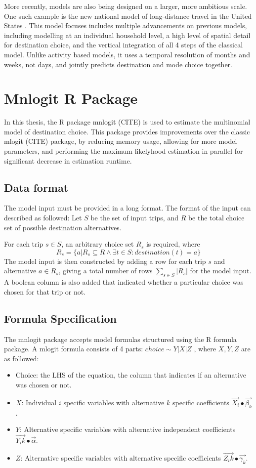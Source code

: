 More recently, models are also being designed on a larger, more ambitious scale. One such example is the new national model of long-distance travel in the United States \parencite{Outwater15}. This model focuses includes multiple advancements on previous models, including modelling at an individual household level, a high level of spatial detail for destination choice, and the vertical integration of all 4 steps of the classical model. Unlike activity based models, it uses a temporal resolution of months and weeks, not days, and jointly predicts destination and mode choice together. 

\section{Mnlogit R Package}
In this thesis, the R package mnlogit (CITE) is used to estimate the multinomial model of destination choice. This package provides improvements over the classic mlogit (CITE) package, by reducing memory usage, allowing for more model parameters, and performing the maximum likelyhood estimation in parallel for significant decrease in estimation runtime.
\subsection{Data format}
The model input must be provided in a long format. The format of the input can described as followed:
Let \(S\)  be the set of input trips, and \(R\)  be the total choice set of possible destination alternatives. 


For each trip $s \in S$, an arbitrary choice set $R_s$ is required, where
$$ R_s  =  \{a | R_s \subseteq R \wedge \exists t \in S : destination(t) = a \} $$ 
The model input is then constructed by adding a row for each trip $s$ and alternative $a \in R_s$, giving a total number of rows  $ \sum_{s \in S} |R_s| $  for the model input. A boolean column is also added that indicated whether a particular choice was chosen for that trip or not.

\subsection{Formula Specification}
The mnlogit package accepts model formulas structured using the R formula package. A mlogit formula consists of 4 parts: $ choice \sim Y | X | Z $ , where $X,Y,Z$ are as followed:

\begin{itemize}
	\item Choice: the LHS of the equation, the column that indicates if an alternative was chosen or not.
	\item $X$: Individual $i$ specific variables with alternative $k$ specific coefficients $\vec{X_i} ∙\vec{\beta_k}$.

	\item $Y$: Alternative specific variables with alternative independent coefficients $\vec{Y_ik} ∙\vec{\alpha}$. 
	\item $Z$: Alternative specific variables with alternative specific coefficients
$\vec{Z_ik} ∙\vec{\gamma_k}$.
\end{itemize}

